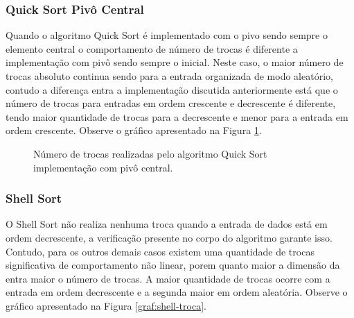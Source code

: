 \documentclass[conference,onecolumn]{IEEEtran}
\begin{document}
\subsubsection{Quick Sort Pivô Central}

Quando o algoritmo Quick Sort é implementado com o pivo sendo sempre o elemento central o comportamento de número de trocas é diferente a implementação com pivô sendo sempre o inicial. Neste caso, o maior número de trocas absoluto continua sendo para a entrada organizada de modo aleatório, contudo a diferença entra a implementação discutida anteriormente está que o número de trocas para entradas em ordem crescente e decrescente é diferente, tendo maior quantidade de trocas para a decrescente e menor para a entrada em ordem crescente. Observe o gráfico apresentado na Figura \ref{graf:quick-central-troca}.

\begin{figure}[H]
\begin{center}
\end{center}
\caption{Número de trocas realizadas pelo algoritmo Quick Sort implementação com pivô central.}
\label{graf:quick-central-troca}
\end{figure}

\subsubsection{Shell Sort}

O Shell Sort não realiza nenhuma troca quando a entrada de dados está em ordem decrescente, a verificação presente no corpo do algoritmo garante isso. Contudo, para os outros demais casos existem uma quantidade de trocas significativa de comportamento não linear, porem quanto maior a dimensão da entra maior o número de trocas. A maior quantidade de trocas ocorre com a entrada em ordem decrescente e a segunda maior em ordem aleatória. Observe o gráfico apresentado na Figura \ref{graf:shell-troca}.
\end{document}
